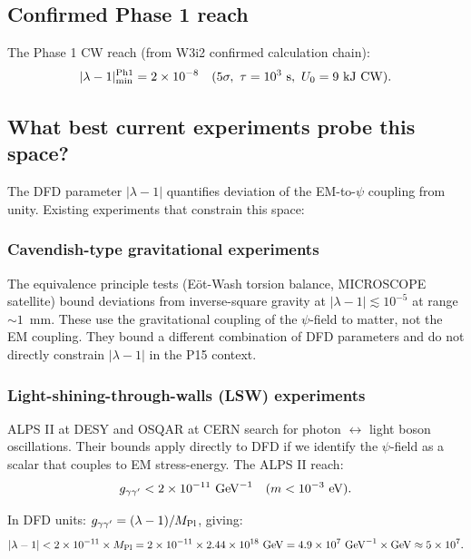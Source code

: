 \documentclass[11pt]{article}
\newcommand{\ee}[1]{\times 10^{#1}}
\newcommand{\lam}{\lambda}
\begin{document}
\subsection{Confirmed Phase 1 reach}

The Phase 1 CW reach (from W3i2 confirmed calculation chain):
\begin{equation}
|\lam-1|_{\rm min}^{\rm Ph1} = 2\ee{-8} \quad (5\sigma,~\tau = 10^3~{\rm s},~
U_0 = 9~{\rm kJ~CW}).
\end{equation}

\subsection{What best current experiments probe this space?}

The DFD parameter $|\lam-1|$ quantifies deviation of the EM-to-$\psi$ coupling
from unity. Existing experiments that constrain this space:

\subsubsection{Cavendish-type gravitational experiments}

The equivalence principle tests (E\"ot-Wash torsion balance, MICROSCOPE satellite)
bound deviations from inverse-square gravity at $|\lam-1| \lesssim 10^{-5}$ at
range $\sim 1$~mm. These use the gravitational coupling of the $\psi$-field to
matter, not the EM coupling. They bound a different combination of DFD parameters
and do not directly constrain $|\lam-1|$ in the P15 context.

\subsubsection{Light-shining-through-walls (LSW) experiments}

ALPS II at DESY and OSQAR at CERN search for photon $\leftrightarrow$ light boson
oscillations. Their bounds apply directly to DFD if we identify the $\psi$-field
as a scalar that couples to EM stress-energy. The ALPS II reach:
\begin{equation}
g_{\gamma\gamma'} < 2\ee{-11}~{\rm GeV}^{-1} \quad (m < 10^{-3}~{\rm eV}).
\end{equation}

In DFD units: $g_{\gamma\gamma'} = (\lam-1)/M_{\rm Pl}$, giving:
\begin{equation}
|\lam-1| < 2\ee{-11} \times M_{\rm Pl} = 2\ee{-11} \times 2.44\ee{18}~{\rm GeV}
= 4.9\ee{7}~{\rm GeV}^{-1} \times {\rm GeV} \approx 5\ee{7}.
\end{equation}
\end{document}
